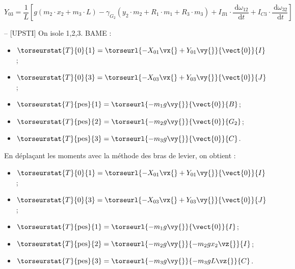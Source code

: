 
$
Y_{03}=\dfrac{1}{L}\left[g\left(m_{2} \cdot x_{2}+m_{3} \cdot L\right)-\gamma_{G_{2}}\left(y_{2} \cdot m_{2}+R_{1} \cdot m_{1}+R_{3} \cdot m_{3}\right)+I_{B 1} \cdot \dfrac{\mathrm{~d} \omega_{12}}{\mathrm{~d} t}+I_{C 3} \cdot \dfrac{\mathrm{~d} \omega_{32}}{\mathrm{~d} t}\right]
$
\ifprof
\begin{corrige}-- [UPSTI]
On isole {1,2,3}.
BAME : 
 
\begin{multicols}{2}
 \begin{itemize}
\item $\torseurstat{T}{0}{1} = \torseurl{-X_{01}\vx{}+Y_{01}\vy{}}{\vect{0}}{I}$;
\item $\torseurstat{T}{0}{3} = \torseurl{-X_{03}\vx{}+Y_{03}\vy{}}{\vect{0}}{J}$;
\item $\torseurstat{T}{\text{pes}}{1} = \torseurl{-m_1 g \vy{}}{\vect{0}}{B}$;
\item $\torseurstat{T}{\text{pes}}{2} = \torseurl{-m_2 g \vy{}}{\vect{0}}{G_2}$;
\item $\torseurstat{T}{\text{pes}}{3} = \torseurl{-m_3 g \vy{}}{\vect{0}}{C}$.
\end{itemize}
\end{multicols}

En déplaçant les moments avec la méthode des bras de levier, on obtient :

\begin{multicols}{2}
 \begin{itemize}
\item $\torseurstat{T}{0}{1} = \torseurl{-X_{01}\vx{}+Y_{01}\vy{}}{\vect{0}}{I}$;
\item $\torseurstat{T}{0}{3} = \torseurl{-X_{03}\vx{}+Y_{03}\vy{}}{\vect{0}}{J}$;
\item $\torseurstat{T}{\text{pes}}{1} = \torseurl{-m_1 g \vy{}}{\vect{0}}{I}$;
\item $\torseurstat{T}{\text{pes}}{2} = \torseurl{-m_2 g \vy{}}{-m_2 g x_2\vz{}}{I}$;
\item $\torseurstat{T}{\text{pes}}{3} = \torseurl{-m_3 g \vy{}}{-m_3 g L\vz{}}{C}$.
\end{itemize}
\end{multicols}


\end{corrige}
